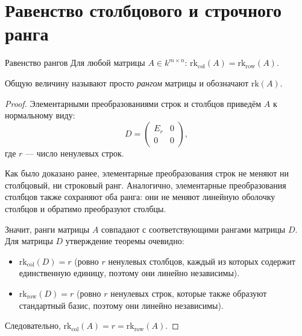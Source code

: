
\section{Равенство столбцового и строчного ранга}

\begin{Theorem}{Равенство рангов}{}
	Для любой матрицы $A \in k^{m \times n}$: \qquad $\mathrm{rk}_{\mathrm{col}}(A) = \mathrm{rk}_{\mathrm{row}}(A).$
	
	Общую величину называют просто \emph{рангом} матрицы и обозначают $\mathrm{rk}(A)$.
\end{Theorem}

\begin{proof}
	Элементарными преобразованиями строк и столбцов приведём $A$ к нормальному виду:
	\[
	D = \begin{pmatrix} E_r & 0 \\ 0 & 0 \end{pmatrix},
	\]
	где $r$ — число ненулевых строк. 
	
	Как было доказано ранее, элементарные преобразования строк не меняют ни столбцовый, ни строковый ранг. Аналогично, элементарные преобразования столбцов также сохраняют оба ранга: они не меняют линейную оболочку столбцов и обратимо преобразуют столбцы.
	
	Значит, ранги матрицы $A$ совпадают с соответствующими рангами матрицы $D$.
	Для матрицы $D$ утверждение теоремы очевидно:
	\begin{itemize}
		\item $\mathrm{rk}_{\mathrm{col}}(D) = r$ (ровно $r$ ненулевых столбцов, каждый из которых содержит единственную единицу, поэтому они линейно независимы).
		\item $\mathrm{rk}_{\mathrm{row}}(D) = r$ (ровно $r$ ненулевых строк, которые также образуют стандартный базис, поэтому они линейно независимы).
	\end{itemize}
	Следовательно, $\mathrm{rk}_{\mathrm{col}}(A) = r = \mathrm{rk}_{\mathrm{row}}(A)$.
\end{proof}
